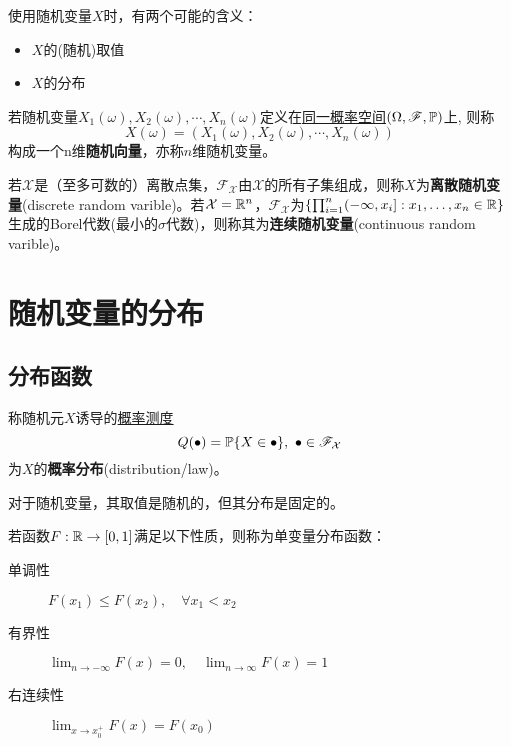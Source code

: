 \begin{remark}
    使用随机变量$X$时，有两个可能的含义：
    \begin{itemize}
        \item$X$的(随机)取值
        \item$X$的分布
    \end{itemize}
\end{remark}

\begin{definition}[随机向量]
    若随机变量$X_1(\omega), X_2(\omega),\cdots , X_n(\omega)$定义在\underline{同一概率空间}$(\Omega,\mathscr{F},\P)$上, 则称
    \[ X(\omega) = (X_1(\omega), X_2(\omega),\cdots , X_n(\omega)) \]
    构成一个n维\textbf{随机向量}，亦称$n$维随机变量。
\end{definition}

\begin{definition}[离散与连续随机变量]
    若$\mathcal{X}$是（至多可数的）离散点集，$\mathscr{F}_{\mathcal{X}}$由$\mathcal{X}$的所有子集组成，则称$X$为\textbf{离散随机变量}(discrete random varible)。若$\mathcal{X} = \R^{n}$，$\mathscr{F}_{\mathcal{X}}$为$\{\prod_{i=1}^{n}(-\infty,x_{i}] : x_{1},\dots,x_{n}\in\R\}$生成的Borel代数(最小的$\sigma$代数)，则称其为\textbf{连续随机变量}(continuous random varible)。
\end{definition}

\section{随机变量的分布}

\subsection{分布函数}

\begin{definition}[概率分布]
    称随机元$X$诱导的\underline{概率测度}
    \[ Q(\bullet)=\P\{X\in\bullet\},\ \bullet\in\mathscr{F}_{\mathcal{X}} \]
    为$X$的\textbf{概率分布}(distribution/law)。
\end{definition}
\begin{remark}
    对于随机变量，其取值是随机的，但其分布是固定的。
\end{remark}

\begin{definition}[单变量分布函数]
    若函数$F : \R \to [0,1] $满足以下性质，则称为单变量分布函数：
    \begin{description}
        \item[单调性] $F(x_1)\le F(x_2) , \quad \forall x_1<x_2$
        \item[有界性] $\lim_{n \to -\infty}F(x)=0, \quad \lim_{n \to \infty}F(x)=1$
        \item[右连续性] $\lim_{x \to x_0^+}F(x)=F(x_0)$
    \end{description}
\end{definition}

